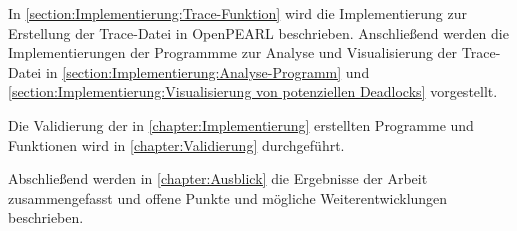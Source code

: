 In \cref{section:Implementierung:Trace-Funktion} wird die Implementierung zur
Erstellung der Trace-Datei in OpenPEARL beschrieben. Anschließend werden die
Implementierungen der Programmme zur Analyse und Visualisierung der Trace-Datei
in \cref{section:Implementierung:Analyse-Programm} und
\cref{section:Implementierung:Visualisierung von potenziellen Deadlocks}
vorgestellt.

Die Validierung der in \cref{chapter:Implementierung} erstellten Programme und
Funktionen wird in \cref{chapter:Validierung} durchgeführt.

Abschließend werden in \cref{chapter:Ausblick} die Ergebnisse der Arbeit
zusammengefasst und offene Punkte und mögliche Weiterentwicklungen beschrieben.